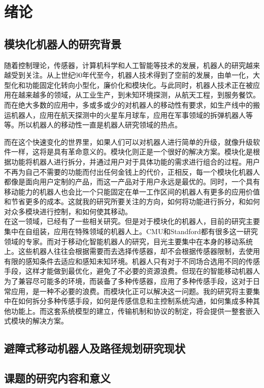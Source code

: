 
\chapter{绪论}
\label{chap:introduction}

\section{模块化机器人的研究背景}

随着控制理论，传感器，计算机科学和人工智能等技术的发展，机器人的研究越来越受到关注。从上世纪90年代至今，机器人技术得到了空前的发展，由单一化，大型化和功能固定化转向小型化，廉价化和模块化。与此同时，机器人技术正在被应用在越来越多的领域，从工业生产，到未知环境探测，从航天工程，到服务餐饮。而在绝大多数的应用中，多或多或少的对机器人的移动性有要求，如生产线中的搬运机器人，应用在航天探测中的火星车月球车，应用在军事领域的拆弹机器人等等。所以机器人的移动性一直是机器人研究领域的热点。

而在这个快速变化的世界里，如果人们可以对机器人进行简单的升级，就像升级软件一样，这将是具有革命意义的。模块化则正是一个很好的解决方案。模块化是根据功能将机器人进行拆分，并通过用户对于具体功能的需求进行组合的过程。用户不再为自己不需要的功能而付出任何金钱上的代价，正相反，每一个模块化机器人都像是面向用户定制的产品，而这一产品对于用户永远是最优的。同时，一个具有移动能力的机器人也会比一个只能固定在单一工作区间的机器人有更多的应用价值和节省更多的成本。这就我的研究所要关注的方向，如何将功能进行拆分，和如何对众多模块进行控制，和如何使其移动。 \\

在这一领域，已经有了一些相关研究。但是对于模块化的机器人，目前的研究主要集中在自组装，应用在特殊领域的机器人上。CMU和Standford都有很多这一研究领域的专家。而对于移动化智能机器人的研究，目光主要集中在本身的移动系统上。这些机器人往往会根据需要而去选择传感器，却不会根据传感器限制，去使用有限的感知条件去适应和感知未知环境。机器人只有对于不同场合选用不同的传感手段，这样才能做到最优化，避免了不必要的资源浪费。但现在的智能移动机器人为了兼容尽可能多的环境，而装备了多种传感器，应用了多种传感手段，这对于日常应用，是一种不必要的浪费。而模块化正可以解决这一问题。我的研究将主要集中在如何拆分多种传感手段，如何是传感信息和主控制系统沟通，如何集成多种其他功能上。而这套系统模型的建立，传输机制和协议的制定，将会提供一整套嵌入式模块的解决方案。


\section{避障式移动机器人及路径规划研究现状}



\section{课题的研究内容和意义}



